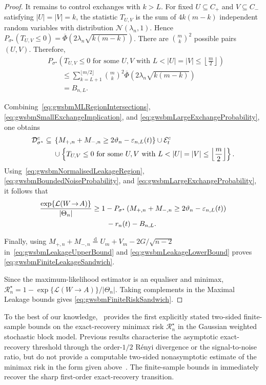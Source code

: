 \documentclass[11pt]{article}
\theoremstyle{definition}
\theoremstyle{remark}
\newcommand{\1}{\boldsymbol{1}}
\newcommand{\ml}[2]{\mathcal{L}(#1\!\to\!#2)}
\begin{document}
\begin{proof}
It remains to control exchanges with $k>L$. For fixed
$U\subseteq C_+$ and $V\subseteq C_-$ satisfying
$|U|=|V|=k$, the statistic $T_{U,V}$ is the sum of
$4k(m-k)$ independent random variables with distribution
$\mathcal N(\lambda_n,1)$. Hence
\(P_{\sigma^\star}(T_{U,V}\leq0)
=\overline\Phi(2\lambda_n\sqrt{k(m-k)})\).
There are $\binom{m}{k}^2$ possible pairs $(U,V)$. Therefore,
\begin{align}
&P_{\sigma^\star}
\left(
T_{U,V}\leq0
\text{ for some }
U,V
\text{ with }
L<|U|=|V|
\leq
\left\lfloor\frac m2\right\rfloor
\right)\\
&\qquad\leq
\sum_{k=L+1}^{\lfloor m/2\rfloor}
\binom{m}{k}^2
\overline\Phi
\left(
2\lambda_n\sqrt{k(m-k)}
\right)\\
&\qquad=
B_{n,L}.
\label{eq:gwsbmLargeExchangeProbability}
\end{align}

Combining~\eqref{eq:gwsbmMLRegionIntersections},
\eqref{eq:gwsbmSmallExchangeImplication}, and
\eqref{eq:gwsbmLargeExchangeProbability}, one obtains
\begin{align}
\mathcal D_{\sigma^\star}^c
\subseteq{}&
\left\{
M_{+,n}+M_{-,n}
\geq
2\vartheta_n-\varepsilon_{n,L}(t)
\right\}
\cup
\mathcal E_t^c
\notag\\
&\cup
\left\{
T_{U,V}\leq0
\text{ for some }
U,V
\text{ with }
L<|U|=|V|
\leq
\left\lfloor\frac m2\right\rfloor
\right\}.
\end{align}
Using~\eqref{eq:gwsbmNormalisedLeakageRegion},
\eqref{eq:gwsbmBoundedNoiseProbability}, and
\eqref{eq:gwsbmLargeExchangeProbability}, it follows that
\begin{align}
\frac{\exp\{\ml{W}{A}\}}{|\Theta_n|}
&\geq
1-
P_{\sigma^\star}
\left(
M_{+,n}+M_{-,n}
\geq
2\vartheta_n-\varepsilon_{n,L}(t)
\right)
\notag\\
&\qquad
-r_n(t)-B_{n,L}.
\label{eq:gwsbmLeakageLowerBound}
\end{align}

Finally, using
\(M_{+,n}+M_{-,n}\overset{\mathrm d}{=}
U_m+V_m-2G/\sqrt{n-2}\)
in~\eqref{eq:gwsbmLeakageUpperBound} and
\eqref{eq:gwsbmLeakageLowerBound} proves
\eqref{eq:gwsbmFiniteLeakageSandwich}.

Since the maximum-likelihood estimator is an equaliser and minimax,
\(\mathcal R_n^\star
=1-\exp\{\ml{W}{A}\}/|\Theta_n|\).
Taking complements in the Maximal Leakage bounds gives
\eqref{eq:gwsbmFiniteRiskSandwich}.
\end{proof}
To the best of our knowledge,~ provides
the first explicitly stated two-sided finite-sample bounds on the exact-recovery minimax risk
$\mathcal R_n^\star$ in the Gaussian weighted stochastic block model.
Previous results characterise the asymptotic exact-recovery threshold
through the order-$1/2$ R\'enyi divergence or the signal-to-noise ratio,
but do not provide a computable two-sided nonasymptotic estimate  of the minimax risk in the form given
above~\cite{JogLoh2015,PandeyKulkarni2024}. The finite-sample bounds in  immediately
recover the sharp first-order exact-recovery transition.
\end{document}
